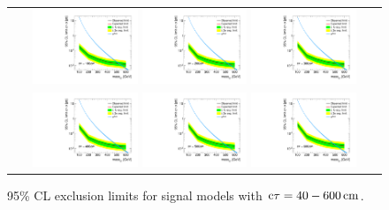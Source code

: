 \begin{figure}[!h]
\begin{tabular}{c}
    \includegraphics[width=0.29\textwidth]{figures/analysis/Interpretation/ExclusionLimits/LimitPlot_ctau100cm.pdf} 
    \includegraphics[width=0.29\textwidth]{figures/analysis/Interpretation/ExclusionLimits/LimitPlot_ctau200cm.pdf} 
    \includegraphics[width=0.29\textwidth]{figures/analysis/Interpretation/ExclusionLimits/LimitPlot_ctau300cm.pdf} \\
    \includegraphics[width=0.29\textwidth]{figures/analysis/Interpretation/ExclusionLimits/LimitPlot_ctau400cm.pdf} 
    \includegraphics[width=0.29\textwidth]{figures/analysis/Interpretation/ExclusionLimits/LimitPlot_ctau500cm.pdf} 
    \includegraphics[width=0.29\textwidth]{figures/analysis/Interpretation/ExclusionLimits/LimitPlot_ctau600cm.pdf} \\
  \end{tabular}
  \caption{95\% CL exclusion limits for signal models with $\text{c}\tau = 40-600\,\text{cm}$.}
  \label{fig:1dLimitsB}
\end{figure} 

